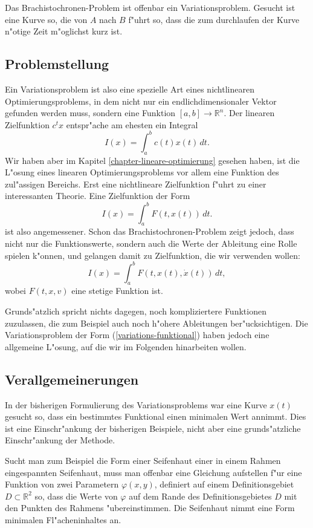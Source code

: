 Das Brachistochronen-Problem ist offenbar ein Variationsproblem.
Gesucht ist eine Kurve so, die von $A$ nach $B$ f"uhrt so, dass
die zum durchlaufen der Kurve n"otige Zeit m"oglichst kurz ist.

\subsection{Problemstellung}
Ein Variationsproblem ist also eine spezielle Art eines nichtlinearen
Optimierungsproblems, in dem nicht nur ein endlichdimensionaler
Vektor gefunden werden muss, sondern eine Funktion $[a,b]\to \mathbb R^n$.
Der linearen Zielfunktion $c^tx$ entspr"ache am ehesten ein Integral
\[
I(x)=\int_a^b c(t) x(t)\,dt.
\]
Wir haben aber im Kapitel \ref{chapter-lineare-optimierung} gesehen haben,
ist die L"osung eines linearen Optimierungsproblems vor allem eine 
Funktion des zul"assigen Bereichs.
Erst eine nichtlineare Zielfunktion f"uhrt zu einer interessanten
Theorie. Eine Zielfunktion der Form
\[
I(x)=\int_a^b F(t, x(t))\,dt.
\]
ist also angemessener.
Schon das Brachistochronen-Problem zeigt
jedoch, dass nicht nur die Funktionswerte, sondern auch die Werte
der Ableitung eine Rolle spielen k"onnen, und gelangen damit
zu Zielfunktion, die wir verwenden wollen:
\begin{equation}
I(x)=\int_a^b F(t, x(t), \dot x(t))\,dt,
\label{variations-funktional}
\end{equation}
wobei $F(t,x,v)$ eine stetige Funktion ist.

Grunds"atzlich spricht nichts dagegen, noch kompliziertere
Funktionen zuzulassen, die zum Beispiel auch noch h"ohere
Ableitungen ber"ucksichtigen.
Die Variationsproblem der Form (\ref{variations-funktional}) 
haben jedoch eine allgemeine L"osung, auf die wir im Folgenden
hinarbeiten wollen.

\subsection{Verallgemeinerungen}
In der bisherigen Formulierung des Variationsproblems war eine
Kurve $x(t)$ gesucht so, dass ein bestimmtes Funktional einen
minimalen Wert annimmt. Dies ist eine Einschr"ankung der bisherigen
Beispiele, nicht aber eine grunds"atzliche Einschr"ankung der Methode.

Sucht man zum Beispiel die Form einer Seifenhaut einer in einem
Rahmen eingespannten Seifenhaut, muss man offenbar eine Gleichung
aufstellen f"ur eine Funktion von zwei Parametern $\varphi(x,y)$,
definiert auf einem Definitionsgebiet $D\subset \mathbb R^2$ so, dass
die Werte von $\varphi$ auf dem Rande des Definitionsgebietes $D$ mit
den Punkten des Rahmens "ubereinstimmen. Die Seifenhaut nimmt eine
Form minimalen Fl"acheninhaltes an.

